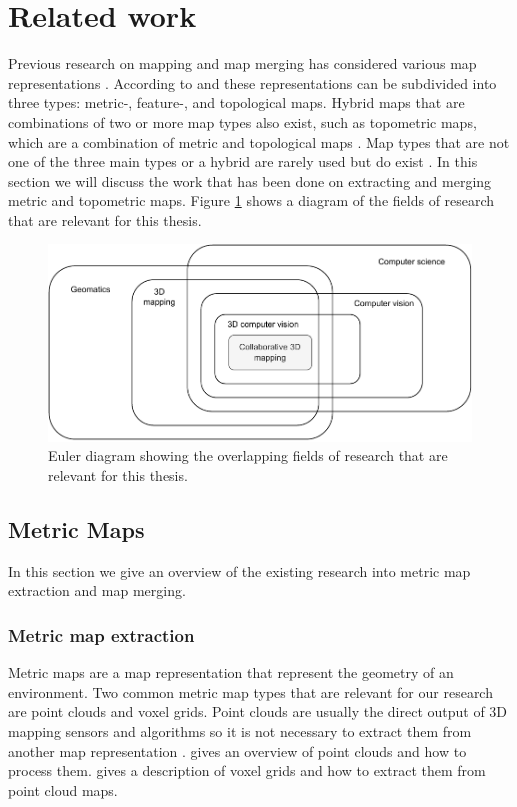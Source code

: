 \section{Related work}
Previous research on mapping and map merging has considered various map representations \citep{tomatis_hybrid_2003,huang_topological_2005,bonanni_3-d_2017,gholamishahbandi_2d_2019}. According to \citet{andersone_heterogeneous_2019} and \citet{yu_review_2020} these representations can be subdivided into three types: metric-, feature-, and topological maps. Hybrid maps that are combinations of two or more map types also exist, such as topometric maps, which are a combination of metric and topological maps \citep{yu_review_2020}. Map types that are not one of the three main types or a hybrid are rarely used but do exist \citep{yu_review_2020}. In this section we will discuss the work that has been done on extracting and merging metric and topometric maps. Figure \ref{fig:euler} shows a diagram of the fields of research that are relevant for this thesis.

\begin{figure}[h]
    \centering
    \includegraphics*[width=.8\textwidth]{./fig/euler_diagram.drawio.pdf}
    \caption{Euler diagram showing the overlapping fields of research that are relevant for this thesis.}
    \label{fig:euler}
\end{figure}


\subsection{Metric Maps}
\label{section:metric_map_merging}
In this section we give an overview of the existing research into metric map extraction and map merging.

\subsubsection{Metric map extraction}
Metric maps are a map representation that represent the geometry of an environment. Two common metric map types that are relevant for our research are point clouds and voxel grids. Point clouds are usually the direct output of 3D mapping sensors and algorithms so it is not necessary to extract them from another map representation \citep{rusu_3d_2011}. \citet{volodine_point_2007} gives an overview of point clouds and how to process them. \citet{elfes_occupancy_1990} gives a description of voxel grids and how to extract them from point cloud maps.

